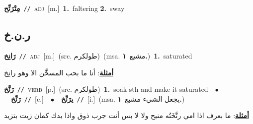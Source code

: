 \documentclass[10pt,a4paper,twoside]{article} %
\begin{document}
\begin{multicols}{2}
{\setlength\topsep{0pt}\textbf{\foreignlanguage{arabic}{مِتْرَنِّح}}\ {\color{gray}\texttt{//}\color{black}}\ \textsc{adj}\ [m.]\ \textbf{1.}~faltering  \textbf{2.}~sway\ } \vspace{2mm}

\vspace{-3mm}
\subsection*{\color{blue}\foreignlanguage{arabic}{ر.ن.خ}\color{blue}{}} 

{\setlength\topsep{0pt}\textbf{\foreignlanguage{arabic}{رَانِخ}}\ {\color{gray}\texttt{//}\color{black}}\ \textsc{adj}\ [m.]\ (src. \color{gray}\foreignlanguage{arabic}{طولكرم}\color{black})\ \color{gray}(msa. \foreignlanguage{arabic}{مشيع}~\foreignlanguage{arabic}{\textbf{١.}})\color{black}\ \textbf{1.}~saturated\  \begin{flushright}\color{gray}\foreignlanguage{arabic}{\textbf{\underline{\foreignlanguage{arabic}{أمثلة}}}: أنا ما بحب المسخَّن الا وهو رانِخ}\end{flushright}\color{black}} \vspace{2mm}

{\setlength\topsep{0pt}\textbf{\foreignlanguage{arabic}{رَنَّخ}}\ {\color{gray}\texttt{//}\color{black}}\ \textsc{verb}\ [p.]\ (src. \color{gray}\foreignlanguage{arabic}{طولكرم}\color{black})\ \textbf{1.}~soak sth and make it saturated\ \ $\bullet$\ \ \setlength\topsep{0pt}\textbf{\foreignlanguage{arabic}{رَنِّخ}}\ {\color{gray}\texttt{//}\color{black}}\ [c.]\ \ $\bullet$\ \ \setlength\topsep{0pt}\textbf{\foreignlanguage{arabic}{يرَنِّخ}}\ {\color{gray}\texttt{//}\color{black}}\ [i.]\ \color{gray}(msa. \foreignlanguage{arabic}{يجعل الشيء مشبع}~\foreignlanguage{arabic}{\textbf{١.}})\color{black}\  \begin{flushright}\color{gray}\foreignlanguage{arabic}{\textbf{\underline{\foreignlanguage{arabic}{أمثلة}}}: ما بعرف اذا امي رنَّخَتُه منيح ولا لا بس أنت جرب ذوق واذا بدك كمان زيت بتزيد}\end{flushright}\color{black}} \vspace{2mm}


\end{multicols}
\end{document}
